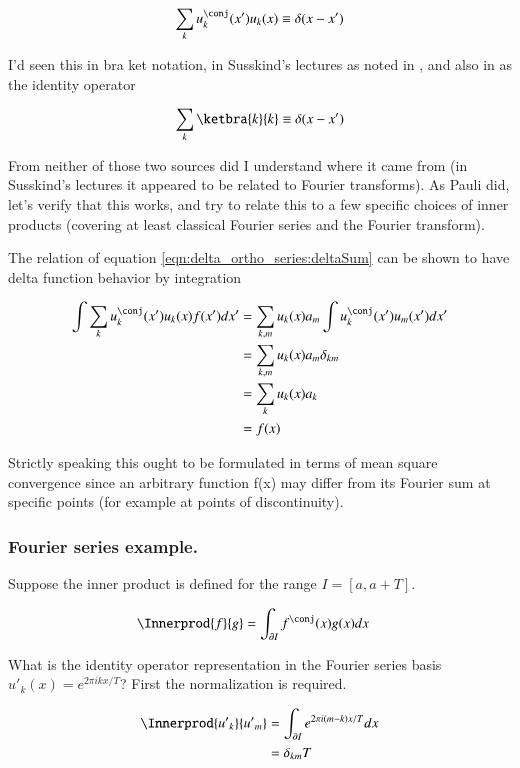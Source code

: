 \begin{align}\label{eqn:delta_ortho_series:deltaSum}
\sum_{k} u_k^\conj(x') u_k(x) \equiv \delta(x-x') 
\end{align}

I'd seen this in bra ket notation, in Susskind's lectures as noted in , and also in \citep{mcmahon2005qmd} as the
identity operator

\begin{align}
\sum_{k} \ketbra{k}{k} \equiv \delta(x-x') 
\end{align}

From neither of those two sources did I understand where it came from (in Susskind's lectures it appeared to be
related to Fourier transforms).
As Pauli did, let's verify that this works, and try to relate this to a few specific choices of inner products (covering at
least classical Fourier series and the Fourier transform).

The relation of equation \ref{eqn:delta_ortho_series:deltaSum} can be shown to have delta function behavior by integration

\begin{align*}
\int \sum_{k} u_k^\conj(x') u_k(x) f(x') dx'
&=
\sum_{k,m} u_k(x) a_m \int u_k^\conj(x') u_m(x') dx' \\
&=
\sum_{k,m} u_k(x) a_m \delta_{km} \\
&=
\sum_{k} u_k(x) a_k \\
&=
f(x) 
\end{align*}

Strictly speaking this ought to be formulated in terms of mean square convergence since an arbitrary function f(x) 
may differ from its Fourier sum at specific points (for example at points of discontinuity).

\subsubsection{Fourier series example. }

Suppose the inner product is defined for the range $I = [a, a+T]$.

\begin{align*}
\Innerprod{f}{g} &= \int_{\partial I} f^\conj(x) g(x) dx
\end{align*}

What is the identity operator representation in the Fourier series basis ${u'}_k(x) = e^{ 2 \pi i k x / T}$?  First the 
normalization is required.

\begin{align*}
\Innerprod{{u'}_k}{{u'}_m} 
&= \int_{\partial I} e^{ 2 \pi i (m-k) x /T } dx  \\
&= \delta_{km} T
\end{align*}

